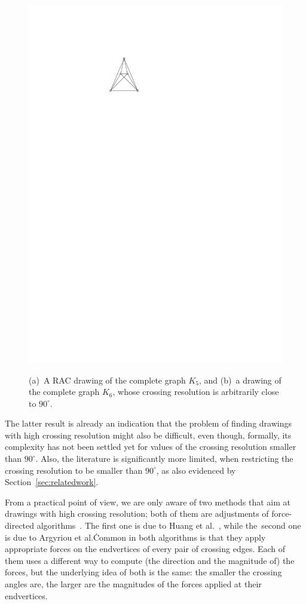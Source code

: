 \documentclass[runningheads]{llncs}
\begin{document}
\begin{figure}[t!]
{	\includegraphics[page=2,scale=0.85]{figures/examples}}
	\caption{%
	(a)~A RAC drawing of the complete graph $K_5$, and
	(b)~a drawing of the complete graph $K_6$, whose crossing resolution is arbitrarily close to $90^\circ$.}
	\label{fig:examples}
\end{figure} 

The latter result is already an indication that the problem of finding drawings with high crossing resolution might also be difficult, even though, formally, its complexity has not been settled yet for values of the crossing resolution smaller than $90^\circ$. Also, the literature is significantly more limited, when restricting the crossing resolution to be smaller than $90^\circ$, as also evidenced by Section~\ref{sec:relatedwork}. 

From a practical point of view, we are only aware of two methods that aim at drawings with high crossing resolution; both of them are adjustments of force-directed algorithms~\cite{DBLP:journals/congnum/Eades84}. The first one is due to Huang et al.~\cite{DBLP:journals/vlc/HuangEHL13}, while the~second one is due to Argyriou et al.\. Common in both algorithms is that they apply appropriate forces on the endvertices of every pair of crossing edges. Each of them uses a different way to compute (the direction and the magnitude of) the forces, but the underlying idea of both is the same: the smaller the crossing angles are, the larger are the magnitudes of the forces applied at their endvertices. 
\end{document}
